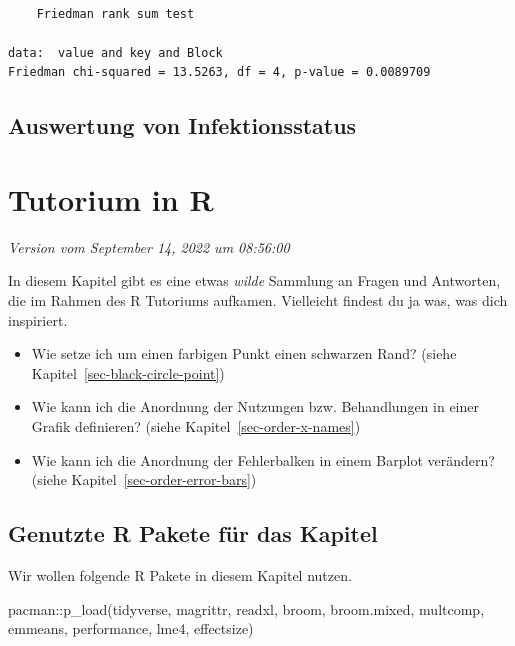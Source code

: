 \documentclass[
  letterpaper,
]{scrbook}
\newenvironment{Shaded}{\begin{snugshade}}{\end{snugshade}}
\newcommand{\FunctionTok}[1]{\textcolor[rgb]{0.28,0.35,0.67}{#1}}
\newcommand{\NormalTok}[1]{\textcolor[rgb]{0.00,0.23,0.31}{#1}}
\newcommand{\SpecialCharTok}[1]{\textcolor[rgb]{0.37,0.37,0.37}{#1}}
\providecommand{\tightlist}{%
  \setlength{\itemsep}{0pt}\setlength{\parskip}{0pt}}\usepackage{longtable,booktabs,array}
\begin{document}
\begin{verbatim}

    Friedman rank sum test

data:  value and key and Block
Friedman chi-squared = 13.5263, df = 4, p-value = 0.0089709
\end{verbatim}

\hypertarget{auswertung-von-infektionsstatus}{%
\section{Auswertung von
Infektionsstatus}\label{auswertung-von-infektionsstatus}}

\hypertarget{tutorium-in-r}{%
\chapter{Tutorium in R}\label{tutorium-in-r}}

\emph{Version vom September 14, 2022 um 08:56:00}

In diesem Kapitel gibt es eine etwas \emph{wilde} Sammlung an Fragen und
Antworten, die im Rahmen des R Tutoriums aufkamen. Vielleicht findest du
ja was, was dich inspiriert.

\begin{itemize}
\tightlist
\item
  Wie setze ich um einen farbigen Punkt einen schwarzen Rand? (siehe
  Kapitel~\ref{sec-black-circle-point})
\item
  Wie kann ich die Anordnung der Nutzungen bzw. Behandlungen in einer
  Grafik definieren? (siehe Kapitel~\ref{sec-order-x-names})
\item
  Wie kann ich die Anordnung der Fehlerbalken in einem Barplot
  verändern? (siehe Kapitel~\ref{sec-order-error-bars})
\end{itemize}

\hypertarget{genutzte-r-pakete-fuxfcr-das-kapitel-23}{%
\section{Genutzte R Pakete für das
Kapitel}\label{genutzte-r-pakete-fuxfcr-das-kapitel-23}}

Wir wollen folgende R Pakete in diesem Kapitel nutzen.

\begin{Shaded}
\begin{Highlighting}[]
\NormalTok{pacman}\SpecialCharTok{::}\FunctionTok{p\_load}\NormalTok{(tidyverse, magrittr, readxl, broom, broom.mixed, }
\NormalTok{               multcomp, emmeans, performance, lme4, effectsize)}
\end{Highlighting}
\end{Shaded}
\end{document}
